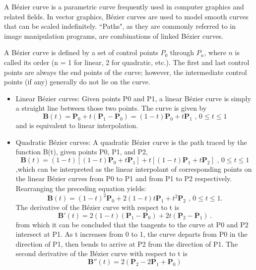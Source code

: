 \begin{note}

A Bézier curve is a parametric curve frequently used in computer graphics and related fields. In vector graphics, Bézier curves are used to model smooth curves that can be scaled indefinitely. ``Paths", as they are commonly referred to in image manipulation programs, are combinations of linked Bézier curves.

A Bézier curve is defined by a set of control points $P_0$ through $P_n$, where $n$ is called its order (n = 1 for linear, 2 for quadratic, etc.). The first and last control points are always the end points of the curve; however, the intermediate control points (if any) generally do not lie on the curve.
\begin{itemize}
\item Linear Bézier curves:
Given points P0 and P1, a linear Bézier curve is simply a straight line between those two points. The curve is given by\\
\begin{equation}
\mathbf {B} (t)=\mathbf {P} _{0}+t(\mathbf {P} _{1}-\mathbf {P} _{0})=(1-t)\mathbf {P} _{0}+t\mathbf {P} _{1}{\mbox{ , }}0\leq t\leq 1
\end{equation}
and is equivalent to linear interpolation.
\item Quadratic Bézier curves:
A quadratic Bézier curve is the path traced by the function B(t), given points P0, P1, and P2,
\begin{equation}
\mathbf {B} (t)=(1-t)[(1-t)\mathbf {P} _{0}+t\mathbf {P} _{1}]+t[(1-t)\mathbf {P} _{1}+t\mathbf {P} _{2}]{\mbox{ , }}0\leq t\leq 1
\end{equation} ,which can be interpreted as the linear interpolant of corresponding points on the linear Bézier curves from P0 to P1 and from P1 to P2 respectively. Rearranging the preceding equation yields:
\begin{equation}
\mathbf {B} (t)=(1-t)^{2}\mathbf {P} _{0}+2(1-t)t\mathbf {P} _{1}+t^{2}\mathbf {P} _{2}{\mbox{ , }}0\leq t\leq 1.
\end{equation}
The derivative of the Bézier curve with respect to t is
\begin{equation}
\mathbf {B} '(t)=2(1-t)(\mathbf {P} _{1}-\mathbf {P} _{0})+2t(\mathbf {P} _{2}-\mathbf {P} _{1})\,.
\end{equation} 
from which it can be concluded that the tangents to the curve at P0 and P2 intersect at P1. As t increases from 0 to 1, the curve departs from P0 in the direction of P1, then bends to arrive at P2 from the direction of P1.
The second derivative of the Bézier curve with respect to t is
\begin{equation}
\mathbf {B} ''(t)=2(\mathbf {P} _{2}-2\mathbf {P} _{1}+\mathbf {P} _{0})
\end{equation}


\end{itemize}
\end{note}
